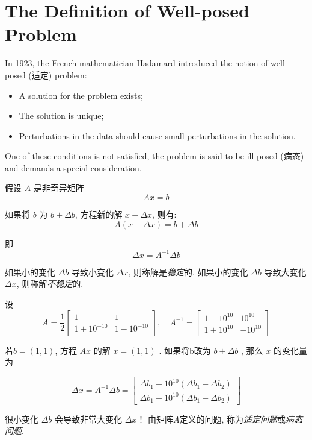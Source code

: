 \section{The Definition of Well-posed Problem}

In 1923, the French mathematician Hadamard introduced the notion of well-posed (适定)  problem:

\begin{itemize}
    \item A solution for the problem exists;
    \item The solution is unique;
    \item Perturbations in the data should cause small perturbations in the solution.
\end{itemize}

One of these conditions is not satisfied, the problem is said to be ill-posed (病态) and demands a special consideration.

\begin{example}
    假设 $ A $ 是非奇异矩阵 $$ A x=b $$

    如果将 $ b $ 为 $ b+\Delta b $, 方程新的解 $ x+\Delta x $, 则有:
$$
A(x+\Delta x)=b+\Delta b
$$

即
$$
\Delta x=A^{-1} \Delta b
$$

如果小的变化 $ \Delta b $ 导致小变化 $ \Delta x $, 则称解是\textit{稳定}的. 如果小的变化 $ \Delta b $ 导致大变化 $ \Delta x $, 则称解\textit{不稳定}的. 

设$$ A=\frac{1}{2}\left[\begin{array}{cc}1 & 1 \\ 1+10^{-10} & 1-10^{-10}\end{array}\right], \quad A^{-1}=\left[\begin{array}{cc}1-10^{10} & 10^{10} \\ 1+10^{10} & -10^{10}\end{array}\right] $$

若$ b=(1,1) $, 方程 $ A x $ 的解 $ x=(1,1) $ . 
如果将b改为 $ b+\Delta b $ , 那么 $ x $ 的变化量为

$$ \Delta x=A^{-1} \Delta b=\left[\begin{array}{l}\Delta b_{1}-10^{10}\left(\Delta b_{1}-\Delta b_{2}\right) \\ \Delta b_{1}+10^{10}\left(\Delta b_{1}-\Delta b_{2}\right)\end{array}\right] $$

很小变化 $ \Delta b $ 会导致非常大变化 $ \Delta x $！ 由矩阵$A$定义的问题, 称为\textit{适定问题}或\textit{病态问题}. 

\end{example}


